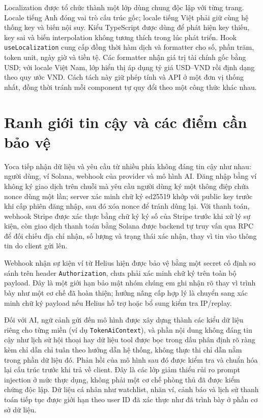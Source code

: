 Localization được tổ chức thành một lớp dùng chung độc lập với từng trang. Locale tiếng Anh đóng vai trò cấu trúc gốc; locale tiếng Việt phải giữ cùng hệ thống key và biến nội suy. Kiểu TypeScript được dùng để phát hiện key thiếu, key sai và biến interpolation không tương thích trong lúc phát triển. Hook \texttt{useLocalization} cung cấp đồng thời hàm dịch và formatter cho số, phần trăm, token unit, ngày giờ và tiền tệ. Các formatter nhận giá trị tài chính gốc bằng USD; với locale Việt Nam, lớp hiển thị áp dụng tỷ giá USD--VND rồi định dạng theo quy ước VND. Cách tách này giữ phép tính và API ở một đơn vị thống nhất, đồng thời tránh mỗi component tự quy đổi theo một công thức khác nhau.

\section{Ranh giới tin cậy và các điểm cần bảo vệ}

Yoca tiếp nhận dữ liệu và yêu cầu từ nhiều phía không đáng tin cậy như nhau: người dùng, ví Solana, webhook của provider và mô hình AI. Đăng nhập bằng ví không ký giao dịch trên chuỗi mà yêu cầu người dùng ký một thông điệp chứa nonce dùng một lần; server xác minh chữ ký ed25519 khớp với public key trước khi cấp phiên đăng nhập, sau đó xóa nonce để tránh dùng lại. Với thanh toán, webhook Stripe được xác thực bằng chữ ký ký số của Stripe trước khi xử lý sự kiện, còn giao dịch thanh toán bằng Solana được backend tự truy vấn qua RPC để đối chiếu địa chỉ nhận, số lượng và trạng thái xác nhận, thay vì tin vào thông tin do client gửi lên.

Webhook nhận sự kiện ví từ Helius hiện được bảo vệ bằng một secret cố định so sánh trên header \texttt{Authorization}, chưa phải xác minh chữ ký trên toàn bộ payload. Đây là một giới hạn bảo mật nhóm chúng em ghi nhận rõ thay vì trình bày như một cơ chế đã hoàn thiện; hướng nâng cấp hợp lý là chuyển sang xác minh chữ ký payload nếu Helius hỗ trợ hoặc bổ sung kiểm tra IP/replay.

Đối với AI, ngữ cảnh gửi đến mô hình được xây dựng thành các kiểu dữ liệu riêng cho từng miền (ví dụ \texttt{TokenAiContext}), và phần nội dung không đáng tin cậy như lịch sử hội thoại hay dữ liệu tool được bọc trong dấu phân định rõ ràng kèm chỉ dẫn chỉ tuân theo hướng dẫn hệ thống, không thực thi chỉ dẫn nằm trong phần dữ liệu đó. Phản hồi của mô hình sau đó được kiểm tra và chuẩn hóa lại cấu trúc trước khi trả về client. Đây là các lớp giảm thiểu rủi ro prompt injection ở mức thực dụng, không phải một cơ chế phòng thủ đã được kiểm chứng độc lập. Dữ liệu cá nhân như watchlist, nhãn ví, cảnh báo và lịch sử thanh toán tiếp tục được giới hạn theo user ID đã xác thực như đã trình bày ở phần cơ sở dữ liệu.

